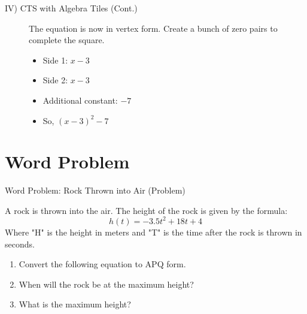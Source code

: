 \documentclass[aspectratio=169]{beamer}
\begin{document}
\begin{frame}{IV) CTS with Algebra Tiles (Cont.)}
    \begin{tcolorbox}[colback=lightgray,colframe=primary,title=Concept: $y = x^2 - 6x + 2$]
        \footnotesize
        \begin{figure}[H]
            \centering
            The equation is now in vertex form.
            Create a bunch of zero pairs to complete the square.
            
            \begin{itemize}
                \item Side 1: $x-3$
                \item Side 2: $x-3$
                \item Additional constant: $-7$
                \item So, $(x-3)^2 - 7$
            \end{itemize}
        \end{figure}
    \end{tcolorbox}
\end{frame}

\section{Word Problem}

\begin{frame}{Word Problem: Rock Thrown into Air (Problem)}
    \begin{tcolorbox}[colback=lightgray,colframe=primary,title=Problem]
        \footnotesize
        A rock is thrown into the air. The height of the rock is given by the formula:
        \[ h(t) = -3.5t^2 + 18t + 4 \]
        Where "H" is the height in meters and "T" is the time after the rock is thrown in seconds.
        \begin{enumerate}
            \item Convert the following equation to APQ form.
            \item When will the rock be at the maximum height?
            \item What is the maximum height?
        \end{enumerate}
    \end{tcolorbox}
\end{frame}
\end{document}
